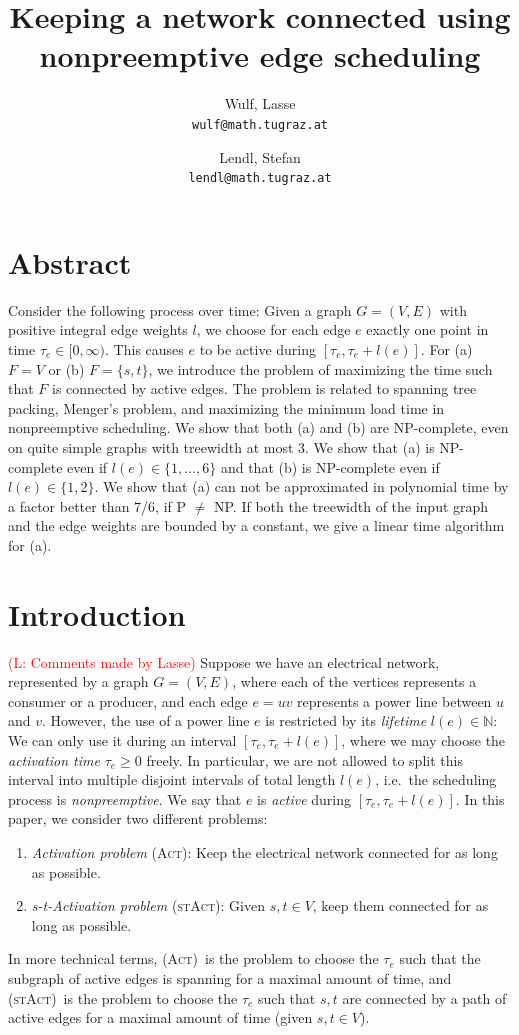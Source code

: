 \documentclass[10pt,a4paper]{article}
\author{
  Wulf, Lasse\\
  \texttt{wulf@math.tugraz.at}
  \and
  Lendl, Stefan\\
  \texttt{lendl@math.tugraz.at}
}
\title{Keeping a network connected using nonpreemptive edge scheduling}
\numberwithin{equation}{section}
\newcommand{\N}{\mathbb{N}}
\newcommand{\set}[1]{\{ #1 \}}
\newcommand{\fromto}[2]{\set{#1, \ldots, #2}}
\newcommand{\comment}[1]{\textcolor{red}{(L: #1)}}
\newcommand{\act}{\textsc{(Act)}}
\newcommand{\stact}{\textsc{(stAct)}}
\begin{document}
\maketitle 

\section{Abstract}
Consider the following process over time: Given a graph $G = (V,E)$ with positive integral edge weights $l$, we choose for each edge $e$ exactly one point in time $\tau_e \in [0, \infty)$. This causes $e$ to be active during $[\tau_e, \tau_e + l(e)]$. For (a) $F = V$ or (b) $F = \set{s,t}$, we introduce the problem of maximizing the time such that $F$ is connected by active edges. The problem is related to spanning tree packing, Menger's problem, and maximizing the minimum load time in nonpreemptive scheduling. We show that both (a) and (b) are NP-complete, even on quite simple graphs with treewidth at most 3. We show that (a) is NP-complete even if $l(e) \in \fromto{1}{6}$ and that (b) is NP-complete even if $l(e) \in \set{1,2}$. We show that (a) can not be approximated in polynomial time by a factor better than 7/6, if P $\neq$ NP. If both the treewidth of the input graph and the edge weights are bounded by a constant, we give a linear time algorithm for (a).
\section{Introduction}
\comment{Comments made by Lasse}
Suppose we have an electrical network, represented by a graph $G = (V,E)$, where each of the vertices represents a consumer or a producer, and each edge $e = uv$ represents a power line between $u$ and $v$. However, the use of a power line $e$ is restricted by its \emph{lifetime} $l(e) \in \N$: We can only use it during an interval $[\tau_e, \tau_e + l(e)]$, where we may choose the \emph{activation time} $\tau_e \geq 0$ freely. In particular, we are not allowed to split this interval into multiple disjoint intervals of total length $l(e)$, i.e.\ the scheduling process is \emph{nonpreemptive}. We say that $e$ is \emph{active} during $[\tau_e, \tau_e + l(e)]$. In this paper, we consider two different problems:
\begin{enumerate}
\item \emph{Activation problem} \act: Keep the electrical network connected for as long as possible.
\item \emph{s-t-Activation problem} \stact: Given $s, t \in V$, keep them connected for as long as possible.
\end{enumerate}
In more technical terms, \act\ is the problem to choose the $\tau_e$ such that the subgraph of active edges is spanning for a maximal amount of time, and \stact\ is the problem to choose the $\tau_e$ such that $s, t$ are connected by a path of active edges for a maximal amount of time (given $s, t \in V$).
\end{document}
